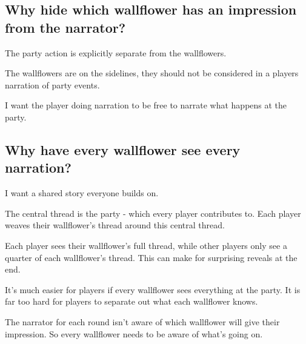 \documentclass[letterpaper, 12pt]{article}
\newcommand{\cquestion}[1]{\subsection{#1}}
\begin{document}
{\cquestion{Why hide which wallflower has an impression from the narrator?}

The party action is explicitly separate from the wallflowers.

The wallflowers are on the sidelines, they should not be considered in a players narration of party events.

I want the player doing narration to be free to narrate what happens at the party.

\pagebreak
\cquestion{Why have every wallflower see every narration?}

I want a shared story everyone builds on.

The central thread is the party - which every player contributes to. Each player weaves their wallflower's thread around this central thread.

Each player sees their wallflower's full thread, while other players only see a quarter of each wallflower's thread. This can make for surprising reveals at the end.

It's much easier for players if every wallflower sees everything at the party. It is far too hard for players to separate out what each wallflower knows.

The narrator for each round isn't aware of which wallflower will give their impression. So every wallflower needs to be aware of what's going on.




}
\end{document}
